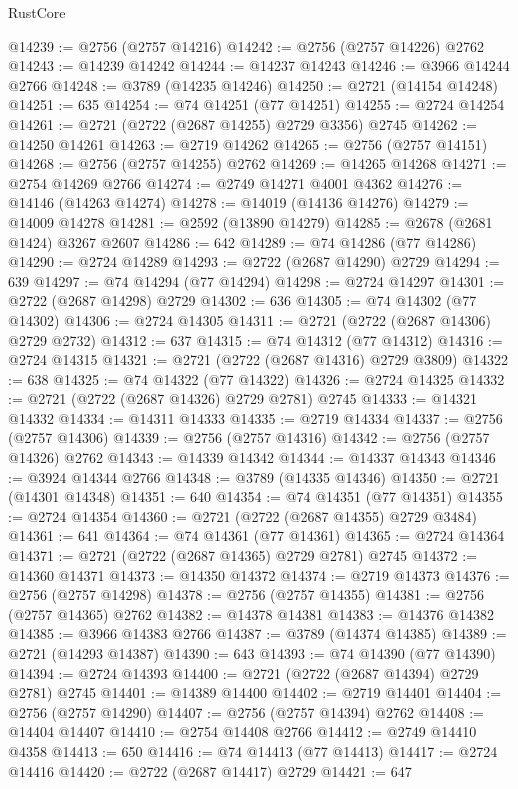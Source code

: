 \begin{lexlean}{RustCore}
\begin{coremodule}
@14239 := @2756 (@2757 @14216)
@14242 := @2756 (@2757 @14226) @2762
@14243 := @14239 @14242
@14244 := @14237 @14243
@14246 := @3966 @14244 @2766
@14248 := @3789 (@14235 @14246)
@14250 := @2721 (@14154 @14248)
@14251 := 635
@14254 := @74 @14251 (@77 @14251)
@14255 := @2724 @14254
@14261 := @2721 (@2722 (@2687 @14255) @2729 @3356) @2745
@14262 := @14250 @14261
@14263 := @2719 @14262
@14265 := @2756 (@2757 @14151)
@14268 := @2756 (@2757 @14255) @2762
@14269 := @14265 @14268
@14271 := @2754 @14269 @2766
@14274 := @2749 @14271 @4001 @4362
@14276 := @14146 (@14263 @14274)
@14278 := @14019 (@14136 @14276)
@14279 := @14009 @14278
@14281 := @2592 (@13890 @14279)
@14285 := @2678 (@2681 @1424) @3267 @2607
@14286 := 642
@14289 := @74 @14286 (@77 @14286)
@14290 := @2724 @14289
@14293 := @2722 (@2687 @14290) @2729
@14294 := 639
@14297 := @74 @14294 (@77 @14294)
@14298 := @2724 @14297
@14301 := @2722 (@2687 @14298) @2729
@14302 := 636
@14305 := @74 @14302 (@77 @14302)
@14306 := @2724 @14305
@14311 := @2721 (@2722 (@2687 @14306) @2729 @2732)
@14312 := 637
@14315 := @74 @14312 (@77 @14312)
@14316 := @2724 @14315
@14321 := @2721 (@2722 (@2687 @14316) @2729 @3809)
@14322 := 638
@14325 := @74 @14322 (@77 @14322)
@14326 := @2724 @14325
@14332 := @2721 (@2722 (@2687 @14326) @2729 @2781) @2745
@14333 := @14321 @14332
@14334 := @14311 @14333
@14335 := @2719 @14334
@14337 := @2756 (@2757 @14306)
@14339 := @2756 (@2757 @14316)
@14342 := @2756 (@2757 @14326) @2762
@14343 := @14339 @14342
@14344 := @14337 @14343
@14346 := @3924 @14344 @2766
@14348 := @3789 (@14335 @14346)
@14350 := @2721 (@14301 @14348)
@14351 := 640
@14354 := @74 @14351 (@77 @14351)
@14355 := @2724 @14354
@14360 := @2721 (@2722 (@2687 @14355) @2729 @3484)
@14361 := 641
@14364 := @74 @14361 (@77 @14361)
@14365 := @2724 @14364
@14371 := @2721 (@2722 (@2687 @14365) @2729 @2781) @2745
@14372 := @14360 @14371
@14373 := @14350 @14372
@14374 := @2719 @14373
@14376 := @2756 (@2757 @14298)
@14378 := @2756 (@2757 @14355)
@14381 := @2756 (@2757 @14365) @2762
@14382 := @14378 @14381
@14383 := @14376 @14382
@14385 := @3966 @14383 @2766
@14387 := @3789 (@14374 @14385)
@14389 := @2721 (@14293 @14387)
@14390 := 643
@14393 := @74 @14390 (@77 @14390)
@14394 := @2724 @14393
@14400 := @2721 (@2722 (@2687 @14394) @2729 @2781) @2745
@14401 := @14389 @14400
@14402 := @2719 @14401
@14404 := @2756 (@2757 @14290)
@14407 := @2756 (@2757 @14394) @2762
@14408 := @14404 @14407
@14410 := @2754 @14408 @2766
@14412 := @2749 @14410 @4358
@14413 := 650
@14416 := @74 @14413 (@77 @14413)
@14417 := @2724 @14416
@14420 := @2722 (@2687 @14417) @2729
@14421 := 647

\end{coremodule}
\end{lexlean}
